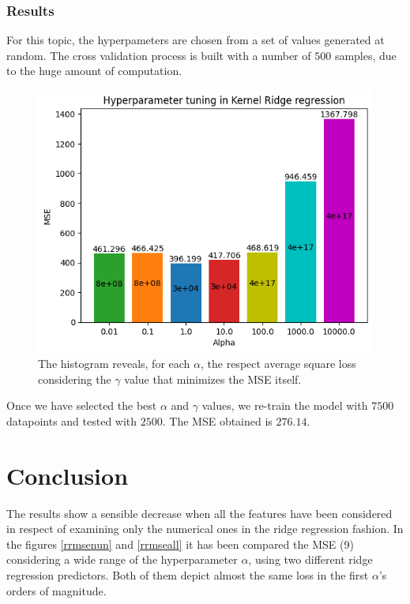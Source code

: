 \documentclass{article}
\begin{document}
\subsubsection{Results}
For this topic, the hyperpameters are chosen from a set of values generated at random. The cross validation process is built with a number of $500$ samples, due to the huge amount of computation. 
\begin{figure}[H]
	\begin{adjustwidth}{0 cm}{}
		\begin{center}
			\includegraphics[scale= 0.7]{images/hyptuningKRR.png}
		\end{center}
	\end{adjustwidth}
	\caption{The histogram reveals, for each $\alpha$, the respect average square loss considering the $\gamma$ value that minimizes the MSE itself.}
	\label{hyptuningKRR}
\end{figure}
    
Once we have selected the best $\alpha$ and $\gamma$ values, we re-train the model with $7500$ datapoints and tested with $2500$. The MSE obtained is $276.14$. 

\section{Conclusion}
The results show a sensible decrease when all the features have been considered in respect of examining only the numerical ones in the ridge regression fashion. In the figures \ref{rrmsenun} and \ref{rrmseall} it has been compared the MSE (9) considering a wide range of the hyperparameter $\alpha$, using two different ridge regression predictors. Both of them depict almost the same loss in the first $\alpha$'s orders of magnitude.   
\end{document}

